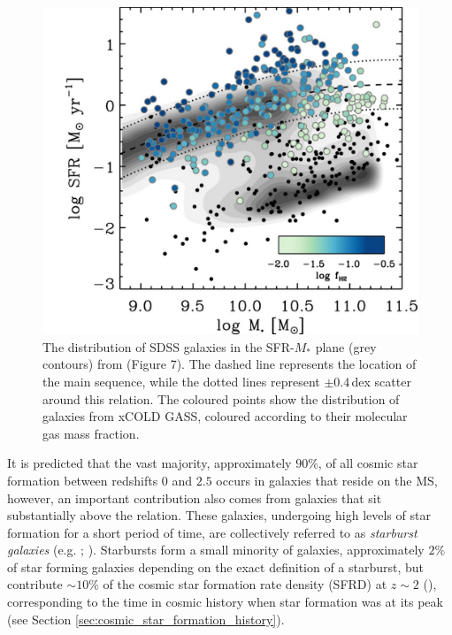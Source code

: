 \begin{figure}
    \centering
	\includegraphics[width=0.75\columnwidth]{Figures/saintonge_ms.pdf}
	\caption{The distribution of SDSS galaxies in the SFR-$M_*$ plane (grey contours) from \citealt{Saintonge_2017} (Figure 7). The dashed line represents the location of the main sequence, while the dotted lines represent $\pm0.4\,$dex scatter around this relation. The coloured points show the distribution of galaxies from xCOLD GASS, coloured according to their molecular gas mass fraction.}
	\label{fig:star_forming_main_sequence}
\end{figure}

It is predicted that the vast majority, approximately $90\%$, of all cosmic star formation between redshifts $0$ and $2.5$ occurs in galaxies that reside on the MS, however, an important contribution also comes from galaxies that sit substantially above the relation. These galaxies, undergoing high levels of star formation for a short period of time, are collectively referred to as \textit{starburst galaxies} (e.g. \citealt{Muxlow_2006}; \citealt{Rinaldi_2022}). Starbursts form a small minority of galaxies, approximately $2\%$ of star forming galaxies depending on the exact definition of a starburst, but contribute $\sim 10\%$ of the cosmic star formation rate density (SFRD) at $z \sim 2$ (\citealt{Rodighiero_2011}), corresponding to the time in cosmic history when star formation was at its peak (see Section \ref{sec:cosmic_star_formation_history}).


